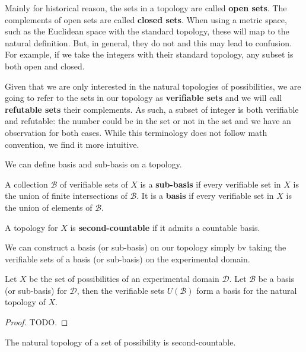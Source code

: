 \documentclass[11pt,letterpaper,fleqn]{memoir} %
\begin{document}
Mainly for historical reason, the sets in a topology are called \textbf{open sets}. The complements of open sets are called \textbf{closed sets}. When using a metric space, such as the Euclidean space with the standard topology, these will map to the natural definition. But, in general, they do not and this may lead to confusion. For example, if we take the integers with their standard topology, any subset is both open and closed.

Given that we are only interested in the natural topologies of possibilities, we are going to refer to the sets in our topology as \textbf{verifiable sets} and we will call \textbf{refutable sets} their complements. As such, a subset of integer is both verifiable and refutable: the number could be in the set or not in the set and we have an observation for both cases.  While this terminology does not follow math convention, we find it more intuitive.

We can define basis and sub-basis on a topology.
\begin{mathSection}
\begin{defn}
	A collection $\mathcal{B}$ of verifiable sets of $X$ is a \textbf{sub-basis} if every verifiable set in $X$ is the union of finite intersections of $\mathcal{B}$. It is a \textbf{basis} if every verifiable set in $X$ is the union of elements of $\mathcal{B}$.
\end{defn}
\begin{defn}
	A topology for $X$ is \textbf{second-countable} if it admits a countable basis.
\end{defn}
\end{mathSection}

We can construct a basis (or sub-basis) on our topology simply bv taking the verifiable sets of a basis (or sub-basis) on the experimental domain.

\begin{mathSection}
	\begin{prop}
		Let $X$ be the set of possibilities of an experimental domain $\mathcal{D}$. Let $\mathcal{B}$ be a basis (or sub-basis) for $\mathcal{D}$, then the verifiable sets $U(\mathcal{B})$ form a basis for the natural topology of $X$.
	\end{prop}
	\begin{proof}
		TODO.
	\end{proof}
	\begin{prop}
	The natural topology of a set of possibility is second-countable.
\end{prop}
\end{mathSection}
\end{document}
